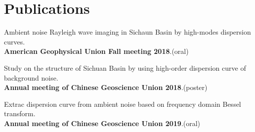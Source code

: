 \documentclass[letterpaper]{article}
\renewenvironment{itemize}{
  \begin{list}{}{
    \setlength{\leftmargin}{1.2em}
  }
}{
  \end{list}
}
\begin{document}
%
%
%


%
%


\section*{Publications}


\begin{itemize}
\item Ambient noise Rayleigh wave imaging in Sichaun Basin by high-modes dispersion curves.\\
\textbf{American Geophysical Union Fall meeting 2018}.(oral)
\item Study on the structure of Sichuan Basin by using high-order dispersion curve of background noise.\\
\textbf{Annual meeting of Chinese Geoscience Union 2018}.(poster)
\item Extrac dispersion curve from ambient noise based on frequency domain Bessel transform.\\
\textbf{Annual meeting of Chinese Geoscience Union 2019}.(oral)
\end{itemize}

%
\end{document}
